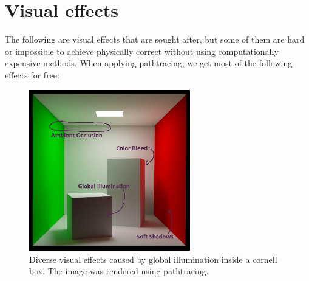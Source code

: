 \documentclass{ACGSeminar}
\begin{document}
\section{Visual effects} 
	The following are visual effects that are sought after, but some of them are hard or impossible to achieve physically correct without using
	computationally expensive methods. When applying pathtracing, we get most of the following effects for free: 
	\begin{figure}[htb!]%
	\begin{center}%
		\includegraphics[width=7cm]{img/visual_effects.png}
	\end{center}%
	\caption{Diverse visual effects caused by global illumination inside a cornell box. The image was rendered using pathtracing.}%
	\label{fig:visual_effects}%
	\end{figure}%
\end{document}
